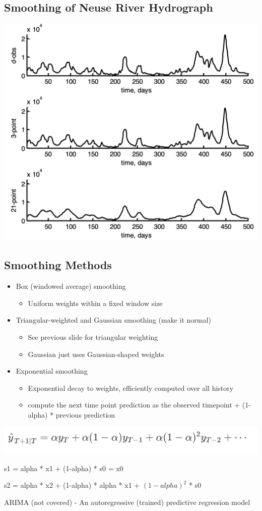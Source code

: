 \documentclass[11pt]{article}
\theoremstyle{definition}
\begin{document}
\subsection{Smoothing of Neuse River Hydrograph}
\includegraphics[width = \textwidth/2]{18.png}

\subsection{Smoothing Methods}
\begin{itemize}
  \item Box (windowed average) smoothing
  \begin{itemize}
    \item Uniform weights within a fixed window size
  \end{itemize}
  \item Triangular-weighted and Gaussian smoothing (make it normal)
  \begin{itemize}
    \item See previous slide for triangular weighting
    \item Gaussian just uses Gaussian-shaped weights
  \end{itemize} 
  \item Exponential smoothing
  \begin{itemize}
    \item Exponential decay to weights, efficiently computed over all history
    \item compute the next time point prediction as the observed timepoint + (1-alpha) * previous prediction
  \end{itemize}
\end{itemize}
\includegraphics[width = \textwidth/2]{19.png}

s1 = alpha * x1 + (1-alpha) * s0 = x0

s2 = alpha * x2 + (1-alpha) * alpha * x1 + $(1-alpha)^2$ * s0 


ARIMA (not covered) - An autoregressive (trained) predictive regression model
\end{document}
